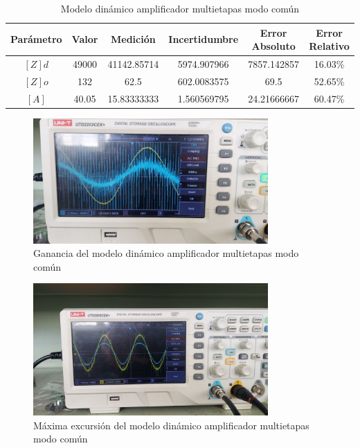 \begin{table}[h!]
\centering
\begin{tabular}{|c|c|c|c|c|c|}
\hline
\textbf{Parámetro} & \textbf{Valor} & \textbf{Medición} & \textbf{Incertidumbre} & \textbf{Error Absoluto} & \textbf{Error Relativo} \\ \hline
$[Z] d$ & 49000 & 41142.85714 & 5974.907966 & 7857.142857 & 16.03\% \\ \hline
$[Z] o$ & 132 & 62.5 & 602.0083575 & 69.5 & 52.65\% \\ \hline
$[A]$ & 40.05 & 15.83333333 & 1.560569795 & 24.21666667 & 60.47\% \\ \hline
\end{tabular}
\caption{Modelo dinámico amplificador multietapas modo común}
\label{tab:med-modelo-dinamico-amplificador-multietapas-modo-comun}
\end{table}

\begin{figure}
    \centering
    \includegraphics[width=0.8\textwidth]{src/images/resultados/p3/ganancia-multietapas-mod-comun.png}
    \caption{Ganancia del modelo dinámico amplificador multietapas modo común}
    \label{fig:ganancia-multietapas-mod-comun}
\end{figure}

\begin{figure}[ht]
    \centering
    \includegraphics[width=0.8\textwidth]{src/images/resultados/p3/max-excursion-multietapas-mod-comun.png}
    \caption{Máxima excursión del modelo dinámico amplificador multietapas modo común}
    \label{fig:med-max-excursion-multietapas-mod-comun}
\end{figure}

